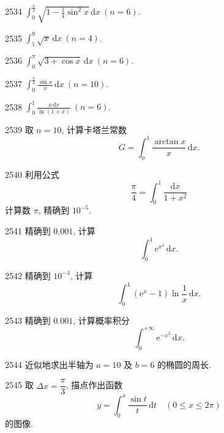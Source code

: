 \begin{prob}[S]{2534}
$\displaystyle \int_0^{\frac{\pi}{2}} \sqrt{1 - \frac{1}{4}\sin^2 x}\,\mathrm{d}x \ (n = 6)$.
\end{prob}


\begin{prob}[S]{2535}
$\displaystyle \int_1^9 \sqrt{x}\,\mathrm{d}x \ (n = 4)$.
\end{prob}

\begin{prob}[S]{2536}
$\displaystyle \int_0^{\pi} \sqrt{3 + \cos x}\,\mathrm{d}x \ (n = 6)$.
\end{prob}

\begin{prob}[S]{2537}
$\displaystyle \int_0^{\frac{\pi}{2}} \frac{\sin x}{x}\,\mathrm{d}x \ (n = 10)$.
\end{prob}

\begin{prob}[S]{2538}
$\displaystyle \int_0^1 \frac{x\,\mathrm{d}x}{\ln(1+x)} \ (n = 6)$.
\end{prob}

\begin{prob}[M]{2539}
取 $n = 10$, 计算卡塔兰常数
\[
G = \int_0^1 \frac{\arctan x}{x}\,\mathrm{d}x.
\]
\end{prob}

\begin{prob}[M]{2540}
利用公式
\[
\frac{\pi}{4} = \int_0^1 \frac{\mathrm{d}x}{1+x^2}
\]
计算数 $\pi$, 精确到 $10^{-5}$.
\end{prob}

\begin{prob}[M]{2541}
精确到 $0.001$, 计算
\[
\int_0^1 \mathrm{e}^{x^2}\,\mathrm{d}x.
\]
\end{prob}

\begin{prob}[M]{2542}
精确到 $10^{-4}$, 计算
\[
\int_0^1 (\mathrm{e}^x - 1)\ln\frac{1}{x}\,\mathrm{d}x.
\]
\end{prob}

\begin{prob}[M]{2543}
精确到 $0.001$, 计算概率积分
\[
\int_0^{+\infty} \mathrm{e}^{-x^2}\,\mathrm{d}x.
\]
\end{prob}

\begin{prob}[M]{2544}
近似地求出半轴为 $a = 10$ 及 $b = 6$ 的椭圆的周长.
\end{prob}

\begin{prob}[M]{2545}
取 $\Delta x = \dfrac{\pi}{3}$, 描点作出函数
\[
y = \int_0^x \frac{\sin t}{t}\,\mathrm{d}t \quad (0 \leqslant x \leqslant 2\pi)
\]
的图像.
\end{prob}
